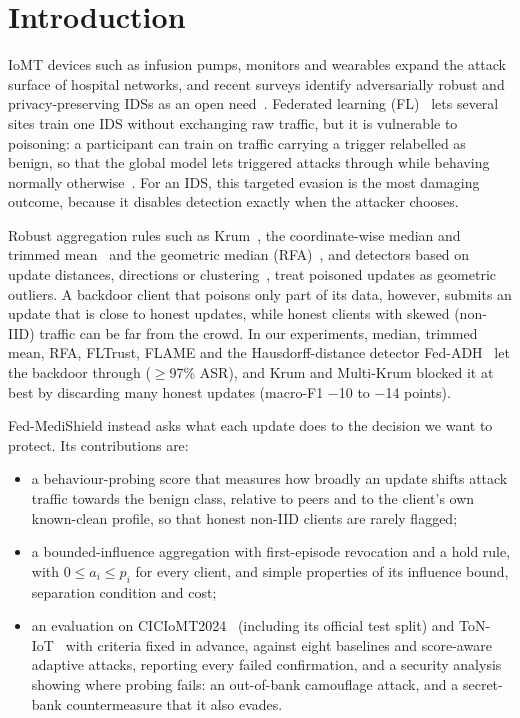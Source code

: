 \documentclass[conference]{IEEEtran}
\begin{document}
\section{Introduction}
IoMT devices such as infusion pumps, monitors and wearables expand the attack surface of hospital networks, and recent surveys identify adversarially robust and privacy-preserving IDSs as an open need~\cite{hassan2025survey}. Federated learning (FL)~\cite{mcmahan2017fedavg} lets several sites train one IDS without exchanging raw traffic, but it is vulnerable to poisoning: a participant can train on traffic carrying a trigger relabelled as benign, so that the global model lets triggered attacks through while behaving normally otherwise~\cite{bagdasaryan2020backdoor}. For an IDS, this targeted evasion is the most damaging outcome, because it disables detection exactly when the attacker chooses.

Robust aggregation rules such as Krum~\cite{blanchard2017krum}, the coordinate-wise median and trimmed mean~\cite{yin2018median} and the geometric median (RFA)~\cite{pillutla2022rfa}, and detectors based on update distances, directions or clustering~\cite{pathak2026early,bi2026hflmnd,zhang2022fldetector,cao2021fltrust}, treat poisoned updates as geometric outliers. A backdoor client that poisons only part of its data, however, submits an update that is close to honest updates, while honest clients with skewed (non-IID) traffic can be far from the crowd. In our experiments, median, trimmed mean, RFA, FLTrust, FLAME and the Hausdorff-distance detector Fed-ADH~\cite{pathak2026early} let the backdoor through ($\geq$97\% ASR), and Krum and Multi-Krum blocked it at best by discarding many honest updates (macro-F1 $-$10 to $-$14 points).

Fed-MediShield instead asks what each update does to the decision we want to protect. Its contributions are:
\begin{itemize}
\item a behaviour-probing score that measures how broadly an update shifts attack traffic towards the benign class, relative to peers and to the client's own known-clean profile, so that honest non-IID clients are rarely flagged;
\item a bounded-influence aggregation with first-episode revocation and a hold rule, with $0 \le a_i \le p_i$ for every client, and simple properties of its influence bound, separation condition and cost;
\item an evaluation on CICIoMT2024~\cite{dadkhah2024ciciomt} (including its official test split) and ToN-IoT~\cite{moustafa2021ton} with criteria fixed in advance, against eight baselines and score-aware adaptive attacks, reporting every failed confirmation, and a security analysis showing where probing fails: an out-of-bank camouflage attack, and a secret-bank countermeasure that it also evades.
\end{itemize}
\end{document}
